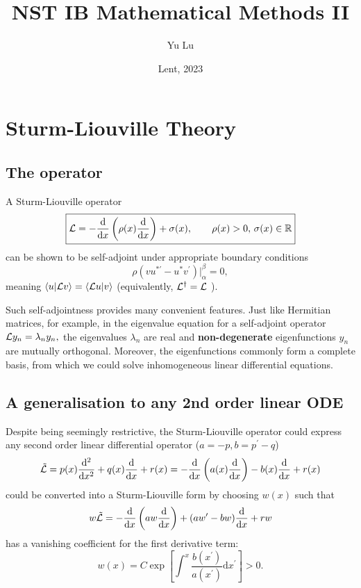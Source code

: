 \documentclass{article}
\title{NST IB Mathematical Methods II}
\date{Lent, 2023}
\author{Yu Lu}
\begin{document}
\maketitle
\section{Sturm-Liouville Theory}
\subsection{The operator}
A Sturm-Liouville operator
\[
\boxed{
    \mathcal{\MakeUppercase{L}} 
    = -\frac{\mathrm{d}}{\mathrm{d}x} \left( \rho (x) \frac{\mathrm{d}}{\mathrm{d}x}   \right) + \sigma(x), \qquad \rho(x) >0, \, \sigma(x) \in \mathbb{\MakeUppercase{R}} 
}
\]
can be shown to be self-adjoint under appropriate boundary conditions
\[
    \rho \left( vu^{*\prime} - u^* v^\prime \right)\big\rvert_\alpha ^\beta =0,
\]
meaning \( \braket{u}{\mathcal{\MakeUppercase{L}} v} = \braket{\mathcal{\MakeUppercase{L}} u}{v}\) (equivalently, \( {\mathcal{\MakeUppercase{L}} }^{\dagger} = \mathcal{\MakeUppercase{L}} \) ). 

Such self-adjointness provides many convenient features. Just like Hermitian matrices, for example, in the eigenvalue equation for a self-adjoint operator \(\mathcal{\MakeUppercase{L}} y_n = \lambda_{n} y_{n}, \) the eigenvalues $\lambda_{n} $ are real and \textbf{non-degenerate} eigenfunctions $y_n$ are mutually orthogonal. Moreover, the eigenfunctions commonly form a complete basis, from which we could solve inhomogeneous linear differential equations. 

\subsection{A generalisation to any 2nd order linear ODE}
Despite being seemingly restrictive, the Sturm-Liouville operator could express any second order linear differential operator ($a = -p, b = p^\prime -q$)
\[
    \tilde{\mathcal{\MakeUppercase{L}}}
    = p(x) \frac{\mathrm{d}^{2} }{\mathrm{d}x^{2} } + q(x) \frac{\mathrm{d}}{\mathrm{d}x} + r(x)
    = -\frac{\mathrm{d}}{\mathrm{d}x} \left( a(x) \frac{\mathrm{d}}{\mathrm{d}x} \right) - b(x) \frac{\mathrm{d}}{\mathrm{d}x} +r(x)
\]
could be converted into a Sturm-Liouville form by choosing $w(x)$ such that 
\[
    w \tilde{\mathcal{\MakeUppercase{L}} } = 
    - \frac{\mathrm{d}}{\mathrm{d}x} \left( a w \frac{\mathrm{d}}{\mathrm{d}x} \right) + 
    (a w^\prime  - b w) \frac{\mathrm{d}}{\mathrm{d}x} + r w
\]
has a vanishing coefficient for the first derivative term: 
\[ \boxed{
    w(x) = C \exp\left[ \int^x \frac{b(x^\prime )}{a(x^\prime )}\mathrm{d} x^\prime \right] > 0.}
\] 
\end{document}
